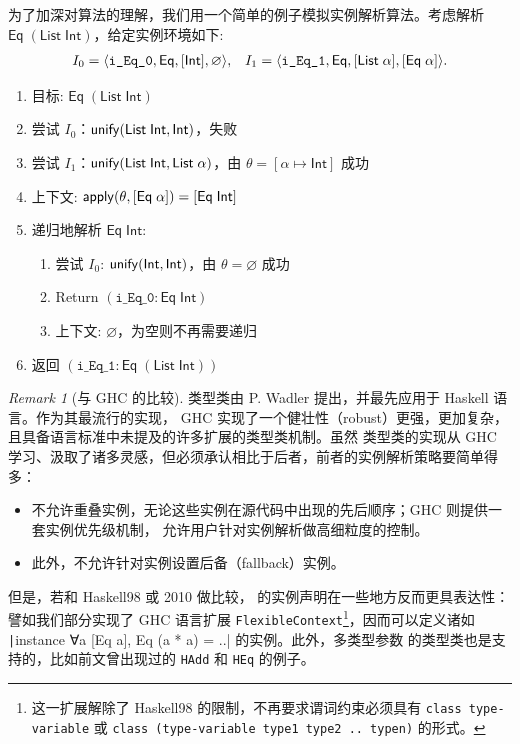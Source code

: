 \documentclass[a4paper, 11pt]{article}
\theoremstyle{remark}\newtheorem*{remark}{Remark}
\theoremstyle{definition}\newtheorem*{definition}{Definition}
\begin{document}
为了加深对算法的理解，我们用一个简单的例子模拟实例解析算法。考虑解析 $\mathsf{Eq}\;(\mathsf{List}\;\mathsf{Int})$，给定实例环境如下:
\begin{align*}
  I_0 = \langle \texttt{i\_Eq\_0}, \mathsf{Eq}, [\mathsf{Int}], \varnothing \rangle, &&
  I_1 = \langle \texttt{i\_Eq\_1}, \mathsf{Eq}, [\mathsf{List}\;\alpha], [\mathsf{Eq}\;\alpha] \rangle.
\end{align*}

\begin{enumerate}\itemsep0em
  \item 目标: $\mathsf{Eq}\;(\mathsf{List}\;\mathsf{Int})$
  \item 尝试 $I_0$：$\mathsf{unify}(\mathsf{List}\;\mathsf{Int}, \mathsf{Int})$，失败
  \item 尝试 $I_1$：$\mathsf{unify}(\mathsf{List}\;\mathsf{Int}, \mathsf{List}\;\alpha)$，由 $\theta = [\alpha \mapsto \mathsf{Int}]$ 成功
  \item 上下文: $\mathsf{apply}(\theta, [\mathsf{Eq}\;\alpha]) = [\mathsf{Eq}\;\mathsf{Int}]$
  \item 递归地解析 $\mathsf{Eq}\;\mathsf{Int}$:
  \begin{enumerate}\itemsep0em
      \item 尝试 $I_0$: $\mathsf{unify}(\mathsf{Int}, \mathsf{Int})$，由 $\theta = \varnothing$ 成功
      \item Return $(\texttt{i\_Eq\_0} : \mathsf{Eq}\;\mathsf{Int})$
      \item 上下文: $\varnothing$，为空则不再需要递归
    \end{enumerate}
  \item 返回 $(\texttt{i\_Eq\_1} :  \mathsf{Eq}\;(\mathsf{List}\;\mathsf{Int}))$
\end{enumerate}

\begin{remark}[与 GHC 的比较]
  类型类由 P. Wadler 提出，并最先应用于 Haskell 语言。作为其最流行的实现，
  GHC 实现了一个健壮性（robust）更强，更加复杂，且具备语言标准中未提及的许多扩展的类型类机制。虽然 \Tigris 类型类的实现从
  GHC 学习、汲取了诸多灵感，但必须承认相比于后者，前者的实例解析策略要简单得多：
\begin{itemize}\itemsep0em
    \item \Tigris 不允许重叠实例，无论这些实例在源代码中出现的先后顺序；GHC 则提供一套实例优先级机制，
      允许用户针对实例解析做高细粒度的控制。
    \item 此外，\Tigris 不允许针对实例设置后备（fallback）实例。
  \end{itemize}
  但是，若和 Haskell98 或 2010 做比较，
  \Tigris 的实例声明在一些地方反而更具表达性：譬如我们部分实现了 GHC 语言扩展 \texttt{FlexibleContext}\footnote{
    这一扩展解除了 Haskell98 的限制，不再要求谓词约束必须具有 \texttt{class type-variable} 或
    \texttt{class (type-variable type1 type2 .. typen)} 的形式。
  }，因而可以定义诸如 \texttt|instance ∀a [Eq a], Eq (a * a) = ..| 的实例。此外，多类型参数
  的类型类也是支持的，比如前文曾出现过的 \texttt{HAdd} 和 \texttt{HEq} 的例子。
\end{remark}
\end{document}
